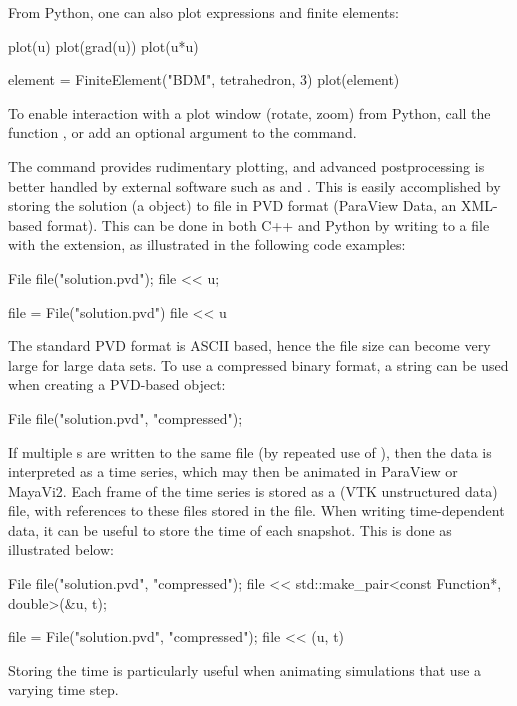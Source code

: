 From Python, one can also plot expressions and finite elements:
\begin{python}
plot(u)
plot(grad(u))
plot(u*u)

element = FiniteElement("BDM", tetrahedron, 3)
plot(element)
\end{python}
To enable interaction with a plot window (rotate, zoom) from Python,
call the function , or add an optional argument
 to the  command.

The  command provides rudimentary plotting, and advanced
postprocessing is better handled by external software such as
\citet{www:paraview} and \citet{www:mayavi}. This is easily
accomplished by storing the solution (a  object) to file
in PVD format (ParaView Data, an XML-based format). This can be done
in both C++ and Python by writing to a file with the 
extension, as illustrated in the following code examples:
\begin{c++}
File file("solution.pvd");
file << u;
\end{c++}
\begin{python}
file = File("solution.pvd")
file << u
\end{python}
The standard PVD format is ASCII based, hence the file size can
become very large for large data sets. To use a compressed binary
format, a string  can be used when creating a
PVD-based  object:
\begin{c++}
File file("solution.pvd", "compressed");
\end{c++}
If multiple s are written to the same file (by repeated
use of \emp{<{}<}), then the data is interpreted as a time series,
which may then be animated in ParaView or MayaVi2. Each frame of the
time series is stored as a  (VTK unstructured data) file,
with references to these files stored in the  file.  When
writing time-dependent data, it can be useful to store the time
 of each snapshot. This is done as illustrated below:
\begin{c++}
File file("solution.pvd", "compressed");
file << std::make_pair<const Function*, double>(&u, t);
\end{c++}
\begin{python}
file = File("solution.pvd", "compressed");
file << (u, t)
\end{python}
Storing the time is particularly useful when animating simulations that
use a varying time step.

